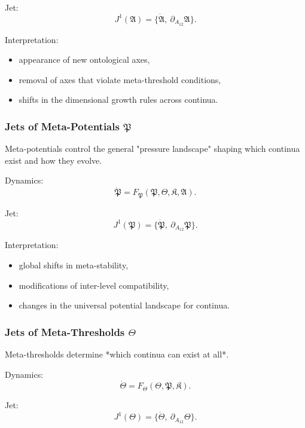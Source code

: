 Jet:
\[
J^1(\mathfrak{A})
= \{\dot{\mathfrak{A}},\ \partial_{A_{12}}\mathfrak{A}\}.
\]

Interpretation:
\begin{itemize}
    \item appearance of new ontological axes,
    \item removal of axes that violate meta-threshold conditions,
    \item shifts in the dimensional growth rules across continua.
\end{itemize}


\subsubsection{Jets of Meta-Potentials $\mathfrak{P}$}

Meta-potentials control the general "pressure landscape" shaping which
continua exist and how they evolve.

Dynamics:
\[
\dot{\mathfrak{P}}
=
F_{\mathfrak{P}}(\mathfrak{P},\mathfrak{\Theta},\mathfrak{K},\mathfrak{A}).
\]

Jet:
\[
J^1(\mathfrak{P})
= \{\dot{\mathfrak{P}},\ \partial_{A_{12}}\mathfrak{P}\}.
\]

Interpretation:
\begin{itemize}
    \item global shifts in meta-stability,
    \item modifications of inter-level compatibility,
    \item changes in the universal potential landscape for continua.
\end{itemize}


\subsubsection{Jets of Meta-Thresholds $\mathfrak{\Theta}$}

Meta-thresholds determine *which continua can exist at all*.

Dynamics:
\[
\dot{\mathfrak{\Theta}}
=
F_{\mathfrak{\Theta}}(\mathfrak{\Theta},\mathfrak{P},\mathfrak{K}).
\]

Jet:
\[
J^1(\mathfrak{\Theta})
=
\{\dot{\mathfrak{\Theta}},\ \partial_{A_{12}}\mathfrak{\Theta}\}.
\]

